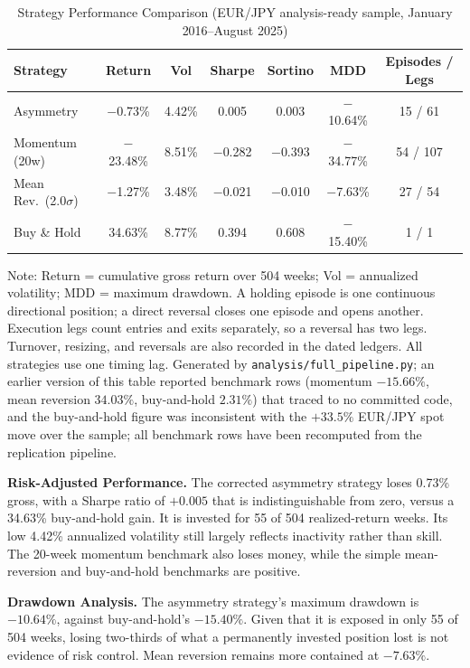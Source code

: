\documentclass[11pt]{article}
\begin{document}
\begin{table}[H]
\centering
\caption{Strategy Performance Comparison (EUR/JPY analysis-ready sample, January 2016--August 2025)}
\label{tab:backtest}
\small
\begin{tabular}{@{}lcccccc@{}}
\toprule
Strategy & Return & Vol & Sharpe & Sortino & MDD & Episodes / Legs \\
\midrule
Asymmetry & $-$0.73\% & 4.42\% & 0.005 & 0.003 & $-$10.64\% & 15 / 61 \\
Momentum (20w) & $-$23.48\% & 8.51\% & $-$0.282 & $-$0.393 & $-$34.77\% & 54 / 107 \\
Mean Rev.\ (2.0$\sigma$) & $-$1.27\% & 3.48\% & $-$0.021 & $-$0.010 & $-$7.63\% & 27 / 54 \\
Buy \& Hold & 34.63\% & 8.77\% & 0.394 & 0.608 & $-$15.40\% & 1 / 1 \\
\bottomrule
\end{tabular}
\par\vspace{0.3em}
\parbox{\linewidth}{\footnotesize Note: Return = cumulative gross return over 504 weeks; Vol = annualized volatility; MDD = maximum drawdown. A holding episode is one continuous directional position; a direct reversal closes one episode and opens another. Execution legs count entries and exits separately, so a reversal has two legs. Turnover, resizing, and reversals are also recorded in the dated ledgers. All strategies use one timing lag. Generated by \texttt{analysis/full\_pipeline.py}; an earlier version of this table reported benchmark rows (momentum $-15.66\%$, mean reversion $34.03\%$, buy-and-hold $2.31\%$) that traced to no committed code, and the buy-and-hold figure was inconsistent with the $+33.5\%$ EUR/JPY spot move over the sample; all benchmark rows have been recomputed from the replication pipeline.}
\end{table}

\textbf{Risk-Adjusted Performance.} The corrected asymmetry strategy loses 0.73\% gross, with a Sharpe ratio of $+0.005$ that is indistinguishable from zero, versus a 34.63\% buy-and-hold gain. It is invested for 55 of 504 realized-return weeks. Its low 4.42\% annualized volatility still largely reflects inactivity rather than skill. The 20-week momentum benchmark also loses money, while the simple mean-reversion and buy-and-hold benchmarks are positive.

\textbf{Drawdown Analysis.} The asymmetry strategy's maximum drawdown is $-10.64\%$, against buy-and-hold's $-15.40\%$. Given that it is exposed in only 55 of 504 weeks, losing two-thirds of what a permanently invested position lost is not evidence of risk control. Mean reversion remains more contained at $-7.63\%$.
\end{document}

